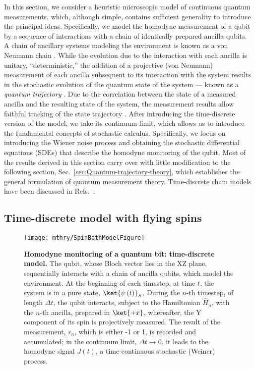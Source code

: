 In this section, we consider a heuristic microscopic model of continuous
quantum measurements, which, although simple, contains sufficient
generality to introduce the principal ideas. Specifically, we model
the homodyne measurement of a qubit by a sequence of interactions
with a chain of identically prepared ancilla qubits.  A chain of
ancillary systems modeling the environment is known as a von Neumann
chain \citep{VonNeumann1932}. While the evolution due to the interaction
with each ancilla is unitary, ``deterministic,'' the addition of
a projective (von Neumann) measurement of each ancilla subsequent
to its interaction with the system results in the stochastic evolution
of the quantum state of the system — known as a\emph{ quantum trajectory}
\citep{Carmichael1993}. Due to the correlation between the state
of a measured ancilla and the resulting  state of the system, the
measurement results allow faithful tracking of the state trajectory
\citep{belavkin1987non,Carmichael1993,Gardiner1992-original-traj,Dalibard1992-original-traj,Korotkov1999-original-traj}.
After introducing the time-discrete version of the model, we take
its continuum limit, which allows us to introduce the fundamental
concepts of stochastic calculus. Specifically, we focus on introducing
the Wiener noise process and obtaining the stochastic differential
equations (SDEs) that describe the homodyne monitoring of the qubit.
Most of the results derived in this section carry over with little
modification to the following section, Sec.~\ref{sec:Quantum-trajectory-theory},
which establishes the general formulation of quantum measurement theory.
Time-discrete chain models have been discussed in Refs.~\citet{Caves1987-time-discrete,Attal2006,Tilloy2015,Korotkov2016-qm-bayes,Bardet2017}.

 

\subsection{Time-discrete model with flying spins}

\begin{figure}
\begin{centering}
\texttt{[image: mthry/SpinBathModelFigure]}
\par\end{centering}
\caption[Homodyne monitoring of a quantum bit: time-discrete model]{\textbf{\label{fig:Ch2:SpinBathModel1}Homodyne monitoring of a quantum
bit: time-discrete model.} The qubit, whose Bloch vector lies in the
XZ plane, sequentially interacts with a chain of ancilla qubits, which
model the environment. At the beginning of each timestep, at time
$t$, the system is in a pure state, $\ket{\psi\left(t\right)}_{S}$.
During the $n$-th timestep, of length $\Delta t$, the qubit interacts,
subject to the Hamiltonian $\hat{H}_{n}$, with the $n$-th ancilla,
prepared in $\ket{+x}$, whereafter, the Y component of its spin is
projectively measured. The result of the measurement, $r_{n}$, which
is either -1 or 1, is recorded and accumulated; in the continuum limit,
$\Delta t\rightarrow0$, it leads to the homodyne signal $J\left(t\right)$,
a time-continuous stochastic (Weiner) process.}
\end{figure}

